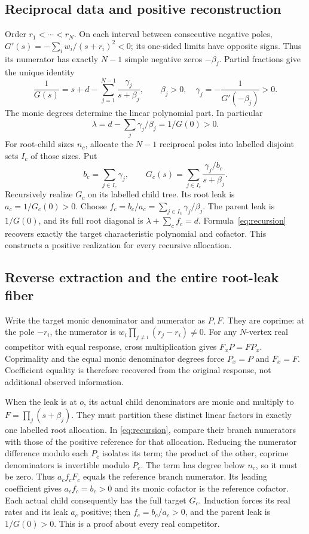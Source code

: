 \documentclass[11pt]{article}
\theoremstyle{remark}
\newcommand{\1}{\mathbf 1}
\begin{document}
\subsection{Reciprocal data and positive reconstruction}
Order $r_1<\cdots<r_N$. On each interval between consecutive negative poles,
$G'(s)=-\sum_i w_i/(s+r_i)^2<0$; its one-sided limits have opposite signs.
Thus its numerator has exactly $N-1$ simple negative zeros $-\beta_j$.
Partial fractions give the unique identity
\begin{equation}\label{eq:reciprocal}
 \frac1{G(s)}=s+d-\sum_{j=1}^{N-1}\frac{\gamma_j}{s+\beta_j},
 \qquad \beta_j>0,\quad\gamma_j=-\frac1{G'(-\beta_j)}>0.
\end{equation}
The monic degrees determine the linear polynomial part. In particular
\[
 \lambda=d-\sum_j\gamma_j/\beta_j=1/G(0)>0.
\]
For root-child sizes $n_c$, allocate the $N-1$ reciprocal poles into labelled
disjoint sets $I_c$ of those sizes. Put
\[
 b_c=\sum_{j\in I_c}\gamma_j,\qquad
 G_c(s)=\sum_{j\in I_c}\frac{\gamma_j/b_c}{s+\beta_j}.
\]
Recursively realize $G_c$ on its labelled child tree. Its root leak is
$a_c=1/G_c(0)>0$. Choose $f_c=b_c/a_c=\sum_{j\in I_c}\gamma_j/\beta_j$.
The parent leak is $1/G(0)$, and its full root diagonal is
$\lambda+\sum_c f_c=d$. Formula~\eqref{eq:recursion} recovers exactly the
target characteristic polynomial and cofactor. This constructs a positive
realization for every recursive allocation.

\subsection{Reverse extraction and the entire root-leak fiber}
Write the target monic denominator and numerator as $P,F$.
They are coprime: at the pole $-r_i$, the numerator is
$w_i\prod_{j\ne i}(r_j-r_i)\ne0$.
For any $N$-vertex real competitor with equal response, cross multiplication
gives $F_xP=FP_x$. Coprimality and the equal monic denominator degrees force
$P_x=P$ and $F_x=F$. Coefficient equality is therefore recovered from the
original response, not additional observed information.

When the leak is at $o$, its actual child denominators are monic and multiply
to $F=\prod_j(s+\beta_j)$. They must partition these distinct linear factors
in exactly one labelled root allocation. In \eqref{eq:recursion}, compare
their branch numerators with those of the positive reference for that allocation.
Reducing the numerator difference modulo each $P_c$ isolates its term;
the product of the other, coprime denominators is invertible modulo $P_c$.
The term has degree below $n_c$, so it must be zero. Thus
$a_cf_cF_c$ equals the reference branch numerator. Its leading coefficient
gives $a_cf_c=b_c>0$ and its monic cofactor is the reference cofactor.
Each actual child consequently has the full target $G_c$. Induction forces
its real rates and its leak $a_c$ positive; then $f_c=b_c/a_c>0$, and
the parent leak is $1/G(0)>0$. This is a proof about every real competitor.
\end{document}
